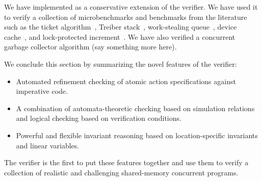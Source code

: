 We have implemented \civl as a conservative extension of the \boogie verifier.  
We have used it to verify a collection of microbenchmarks and benchmarks from the literature such as
the ticket algorithm~\cite{ticket}, Treiber stack~\cite{treiber}, work-stealing queue~\cite{wsq},
device cache~\cite{device-cache}, and lock-protected increment~\cite{incr}.
We have also verified a concurrent garbage collector algorithm (say something more here).

We conclude this section by summarizing the novel features of the \civl verifier:
\begin{itemize}
\item Automated refinement checking of atomic action specifications against imperative code.
\item A combination of automata-theoretic checking based on simulation relations and logical checking based on verification conditions.
\item Powerful and flexible invariant reasoning based on location-specific invariants and linear variables.
\end{itemize}
The \civl verifier is the first to put these features together and use them to verify a collection of realistic and challenging shared-memory
concurrent programs.
